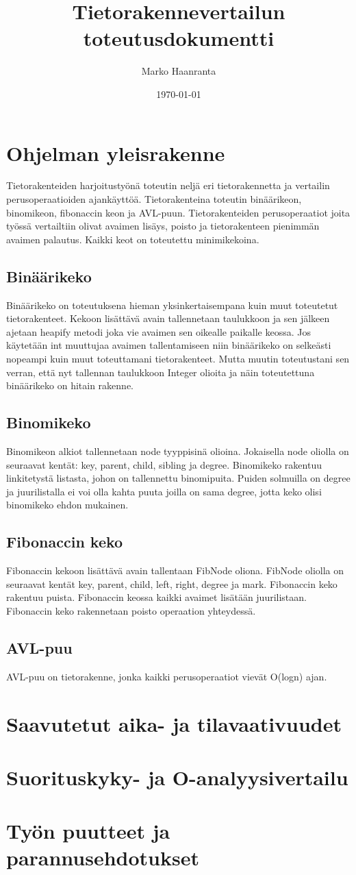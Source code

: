 \documentclass[11pt,a4paper]{article}
\author{Marko Haanranta}
\date{\today}
\title{Tietorakennevertailun toteutusdokumentti}
\begin{document}
\maketitle
\section{Ohjelman yleisrakenne}
Tietorakenteiden harjoitustyönä toteutin neljä eri tietorakennetta ja vertailin perusoperaatioiden ajankäyttöä. Tietorakenteina toteutin binäärikeon, binomikeon, fibonaccin keon ja AVL-puun. Tietorakenteiden perusoperaatiot joita työssä vertailtiin olivat avaimen lisäys, poisto ja tietorakenteen pienimmän avaimen palautus. Kaikki keot on toteutettu minimikekoina.
\subsection{Binäärikeko}
Binäärikeko on toteutuksena hieman yksinkertaisempana kuin muut toteutetut tietorakenteet. Kekoon lisättävä avain tallennetaan taulukkoon ja sen jälkeen ajetaan heapify metodi joka vie avaimen sen oikealle paikalle keossa. Jos käytetään int muuttujaa avaimen tallentamiseen niin binäärikeko on selkeästi nopeampi kuin muut toteuttamani tietorakenteet. Mutta muutin toteutustani sen verran, että nyt tallennan taulukkoon Integer olioita ja näin toteutettuna binäärikeko on hitain rakenne.
\subsection{Binomikeko}
Binomikeon alkiot tallennetaan node tyyppisinä olioina. Jokaisella node oliolla on seuraavat kentät: key, parent, child, sibling ja degree. Binomikeko rakentuu linkitetystä listasta, johon on tallennettu binomipuita. Puiden solmuilla on degree ja juurilistalla ei voi olla kahta puuta joilla on sama degree, jotta keko olisi binomikeko ehdon mukainen. 
\subsection{Fibonaccin keko}
Fibonaccin kekoon lisättävä avain tallentaan FibNode oliona. FibNode oliolla on seuraavat kentät key, parent, child, left, right, degree ja mark. Fibonaccin keko rakentuu puista. Fibonaccin keossa kaikki avaimet lisätään juurilistaan. Fibonaccin keko rakennetaan poisto operaation yhteydessä.
\subsection{AVL-puu}
AVL-puu on tietorakenne, jonka kaikki perusoperaatiot vievät O(logn) ajan.
\section{Saavutetut aika- ja tilavaativuudet}
\section{Suorituskyky- ja O-analyysivertailu}

\section{Työn puutteet ja parannusehdotukset}
\end{document}
